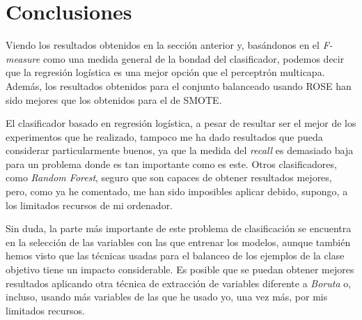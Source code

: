 \section{Conclusiones}
Viendo los resultados obtenidos en la sección anterior y, basándonos en el
\textit{F-measure} como una medida general de la bondad del clasificador,
podemos decir que la regresión logística es una mejor opción que el perceptrón
multicapa. Además, los resultados obtenidos para el conjunto balanceado usando
ROSE han sido mejores que los obtenidos para el de SMOTE.

El clasificador basado en regresión logística, a pesar de resultar ser el mejor
de los experimentos que he realizado, tampoco me ha dado resultados que pueda
considerar particularmente buenos, ya que la medida del \textit{recall} es
demasiado baja para un problema donde es tan importante como es este. Otros
clasificadores, como \textit{Random Forest}, seguro que son capaces de obtener
resultados mejores, pero, como ya he comentado, me han sido imposibles aplicar
debido, supongo, a los limitados recursos de mi ordenador.

Sin duda, la parte más importante de este problema de clasificación se
encuentra en la selección de las variables con las que entrenar los modelos,
aunque también hemos visto que las técnicas usadas para el balanceo de los
ejemplos de la clase objetivo tiene un impacto considerable. Es posible que se
puedan obtener mejores resultados aplicando otra técnica de extracción de
variables diferente a \textit{Boruta} o, incluso, usando más variables de las
que he usado yo, una vez más, por mis limitados recursos.
